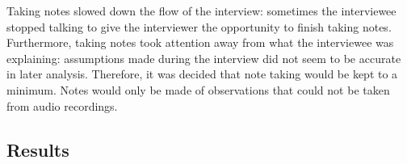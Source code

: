 Taking notes slowed down the flow of the interview: sometimes the interviewee stopped talking to give the interviewer the opportunity to finish taking notes. Furthermore, taking notes took attention away from what the interviewee was explaining: assumptions made during the interview did not seem to be accurate in later analysis. Therefore, it was decided that note taking would be kept to a minimum. Notes would only be made of observations that could not be taken from audio recordings.

\subsection{Results}
